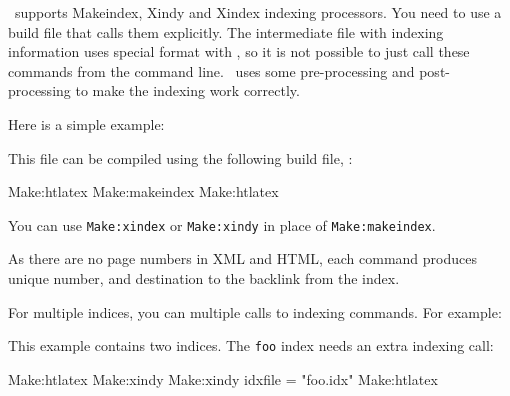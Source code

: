 
\makefourht\ supports Makeindex, Xindy and Xindex indexing processors. 
You need to use a build file that calls them explicitly. The intermediate
file with indexing information uses special format with \texfourht, so 
it is not possible to just call these commands from the command line.
\makefourht\ uses some pre-processing and post-processing to make the indexing
work correctly.

Here is a simple example:


This file can be compiled using the following build file, :

\begin{luasource}
Make:htlatex {}
Make:makeindex {}
Make:htlatex{}
\end{luasource}

You can use \verb|Make:xindex| or \verb|Make:xindy| in place of \verb|Make:makeindex|.

As there are no page numbers in XML and HTML, each  command produces unique
number, and destination to the backlink from the index.


For multiple indices, you can multiple calls to indexing commands. For example:


This example contains two indices. The \verb|foo| index needs an extra 
indexing call:

\begin{luasource}
Make:htlatex {}
Make:xindy {}
Make:xindy {idxfile = "foo.idx"}
Make:htlatex {}
\end{luasource}

